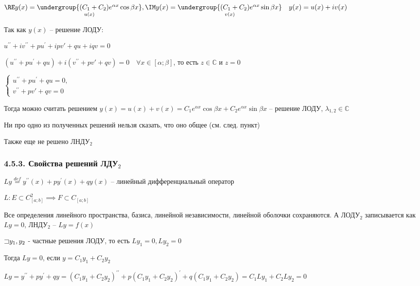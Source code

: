 \documentclass[12pt]{article}
\begin{document}
\begin{enumerate}
        $\RE y(x) = \underset{u(x)}{\undergroup{(C_1 + C_2) e^{\alpha x} \cos\beta x}}, \IM y(x) = \underset{v(x)}{\undergroup{(C_1 + C_2) e^{\alpha x} \sin\beta x}} \quad y(x) = u(x) + iv(x)$

        Так как $y(x)$ -- решение ЛОДУ:

        $u^{\prime\prime} + iv^{\prime\prime} + pu^\prime + ipv\prime + qu + iqv = 0$

        $(u^{\prime\prime} + pu^\prime + qu) + i(v^{\prime\prime} + pv\prime + qv) = 0 \quad \forall x \in [\alpha; \beta]$, то есть $z \in \mathbb{C}$ и $z = 0$

        $\begin{cases}
            u^{\prime\prime} + pu^\prime + qu = 0, \\
            v^{\prime\prime} + pv\prime + qv = 0
        \end{cases}$

        Тогда можно считать решением $y(x) = u(x) + v(x) = C_1 e^{\alpha x}\cos\beta x + C_2 e^{\alpha x} \sin\beta x$ -- решение ЛОДУ, $\lambda_{1,2} \in \mathbb{C}$
    \end{enumerate}

    \Nota Ни про одно из полученных решений нельзя сказать, что оно общее (см. след. пункт)

    Также еще не решено ЛНДУ$_2$

    \subsubsection{4.5.3. Свойства решений ЛДУ$_2$}

    \Def $Ly \stackrel{def}{=} y^{\prime\prime}(x) + py^\prime(x) + qy(x)$ -- линейный дифференциальный оператор

    $L : E \subset C^2_{[a;b]} \implies F \subset C_{[a;b]}$

    \Notas Все определения линейного пространства, базиса, линейной независимости, линейной оболочки сохраняются. А ЛОДУ$_2$ записывается как $Ly = 0$, ЛНДУ$_2$ -- $Ly = f(x)$

    \begin{MyTheorem}
         $\mathord{\sqsupset} y_1, y_2$ - частные решения ЛОДУ, то есть $Ly_1 = 0, Ly_2 = 0$

        Тогда $Ly = 0$, если $y = C_1 y_1 + C_2 y_2$
    \end{MyTheorem}

    \begin{MyProof}
        $Ly = y^{\prime\prime} + py^\prime + qy = (C_1 y_1 + C_2 y_2)^{\prime\prime} + p(C_1 y_1 + C_2 y_2)^{\prime} + q(C_1 y_1 + C_2 y_2) = C_1 Ly_1 + C_2 L y_2 = 0$

    \end{MyProof}
\end{document}
